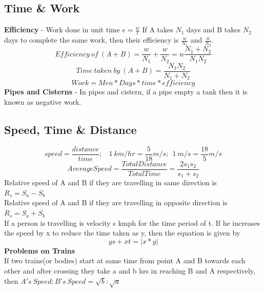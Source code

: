 \subsection{Time \& Work}
\textbf{Efficiency} - Work done in unit time \(e=\frac{w}{t}\)
If A takes \(N_1\) days and B takes \(N_2\) days to complete the same work, then their efficiency is \(\frac{w}{N_1}\) and \(\frac{w}{N_2}\).\\
\[Efficiency\ of\ (A+B)=\frac{w}{N_1}+\frac{w}{N_2}=w\frac{N_1+N_2}{N_1N_2}\]
\[Time\ taken\ by\ (A+B)=\frac{N_1N_2}{N_1+N_2}\]
\[Work=Men*Days*time*efficiency\]
\textbf{Pipes and Cisterns} - In pipes and cistern, if a pipe empty a tank then it is known as negative work.


\subsection{Speed, Time \& Distance}
\[speed=\frac{distance}{time}; \ \ \ \ 1\ km/hr=\frac{5}{18}m/s; \ \ 1\ m/s=\frac{18}{5}m/s\]
\[Average Speed = \frac{Total Distance}{Total Time}=\frac{2s_1s_2}{s_1+s_2}\]
Relative speed of A and B if they are travelling in same direction is \\\( R_s=S_a - S_b\)\\
Relative speed of A and B if they are travelling in opposite direction is \( R_s=S_a + S_b\)\\
If a person is travelling is velocity s kmph for the time period of t. If he increases the speed by x to reduce the time taken as y, then the equation is given by
\[ys + xt = |x*y|\]
\textbf{\large{Problems on Trains}}\\
If two trains(or bodies) start at same time from point A and B towards each other and after crossing they take a and b hrs in reaching B and A respectively, then \(A's\ Speed:B's\ Speed=\sqrt{b}: \sqrt{a}\)\\
